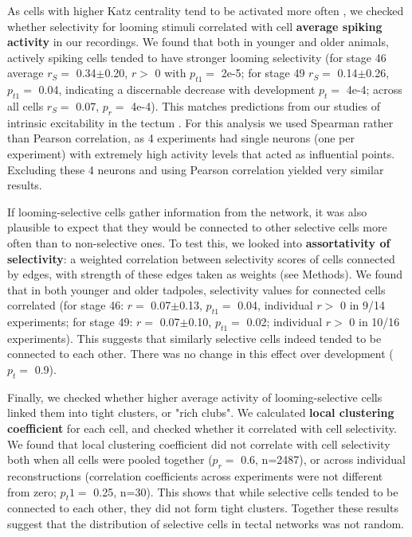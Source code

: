 \documentclass{article}
\begin{document}
As cells with higher Katz centrality tend to be activated more often \citep{fletcher2018katz}, we checked whether selectivity for looming stimuli correlated with cell \textbf{average spiking activity} in our recordings. We found that both in younger and older animals, actively spiking cells tended to have stronger looming selectivity (for stage 46 average $r_S=$ 0.34$\pm$0.20, $r>$ 0 with $p_{t1}=$ 2e-5; for stage 49 $r_S=$ 0.14$\pm$0.26, $p_{t1}=$ 0.04, indicating a discernable decrease with development $p_t=$ 4e-4; across all cells $r_S=$ 0.07, $p_r=$ 4e-4). This matches predictions from our studies of intrinsic excitability in the tectum \citep{busch2019}. For this analysis we used Spearman rather than Pearson correlation, as 4 experiments had single neurons (one per experiment) with extremely high activity levels that acted as influential points. Excluding these 4 neurons and using Pearson correlation yielded very similar results.

If looming-selective cells gather information from the network, it was also plausible to expect that they would be connected to other selective cells more often than to non-selective ones. To test this, we looked into \textbf{assortativity of selectivity}: a weighted correlation between selectivity scores of cells connected by edges, with strength of these edges taken as weights (see Methods). We found that in both younger and older tadpoles, selectivity values for connected cells correlated (for stage 46: $r=$ 0.07$\pm$0.13, $p_{t1}=$ 0.04, individual $r>$ 0 in 9/14 experiments; for stage 49: $r=$ 0.07$\pm$0.10, $p_{t1}=$ 0.02; individual $r>$ 0 in 10/16 experiments). This suggests that similarly selective cells indeed tended to be connected to each other. There was no change in this effect over development ($p_t=$ 0.9).


Finally, we checked whether higher average activity of looming-selective cells linked them into tight clusters, or "rich clubs". We calculated \textbf{local clustering coefficient} for each cell, and checked whether it correlated with cell selectivity. We found that local clustering coefficient did not correlate with cell selectivity both when all cells were pooled together ($p_r=$ 0.6, n=2487), or across individual reconstructions (correlation coefficients across experiments were not different from zero; $p_t1=$ 0.25, n=30). This shows that while selective cells tended to be connected to each other, they did not form tight clusters. Together these results suggest that the distribution of selective cells in tectal networks was not random.
\end{document}
